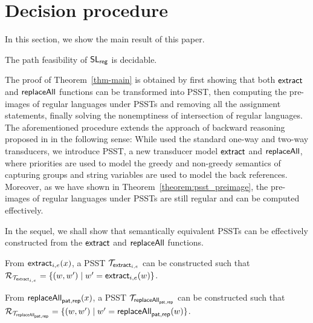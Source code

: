 
\section{Decision procedure} \label{sec:decision}

In this section, we  show the main result of this paper.

\begin{theorem}\label{thm-main}
The path feasibility of $\mathsf{SL}_{\sf reg}$ is decidable.
\end{theorem}

The proof of Theorem~\ref{thm-main} is obtained by first showing that both $\mathsf{extract}$ and $\mathsf{replaceAll}$ functions can be transformed into PSST, then computing the pre-images of regular languages under PSSTs and removing all the assignment statements, finally solving the nonemptiness of intersection of regular languages. The aforementioned procedure extends the approach of backward reasoning proposed in \cite{CCH+18,CHL+19} in the following sense: While \cite{CCH+18,CHL+19} used the standard one-way and two-way transducers, we introduce PSST, a new transducer model $\mathsf{extract}$ and $\mathsf{replaceAll}$, where priorities are used to model the greedy and non-greedy semantics of capturing groups and string variables are used to model the back references. Moreover, as we have shown in Theorem~\ref{theorem:psst_preimage}, the pre-images of regular languages under PSSTs are still regular and can be computed effectively.

In the sequel, we shall show that semantically equivalent PSSTs can be effectively constructed from the $\mathsf{extract}$ and $\mathsf{replaceAll}$ functions. 

\begin{lemma}\label{lem-extract}
From $\mathsf{extract}_{i,e}(x)$, a PSST $\mathcal{T}_{\mathsf{extract}_{i,e}}$ can be constructed such that $\mathcal{R}_{\mathcal{T}_{\mathsf{extract}_{i,e}}} = \{(w, w') \mid w'= \mathsf{extract}_{i,e}(w)\}$.
\end{lemma}

\begin{lemma}\label{lem-replace}
From $\mathsf{replaceAll}_{\mathsf{pat}, \mathsf{rep}}(x)$, a PSST $\mathcal{T}_{\mathsf{replaceAll}_{\mathsf{pat}, \mathsf{rep}}}$ can be constructed such that $\mathcal{R}_{\mathcal{T}_{\mathsf{replaceAll}_{\mathsf{pat}, \mathsf{rep}}}} = \{(w, w') \mid w'= \mathsf{replaceAll}_{\mathsf{pat}, \mathsf{rep}}(w)\}$.
\end{lemma}

